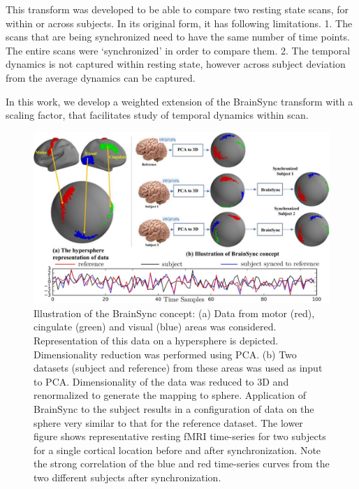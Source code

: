 \documentclass[preprint,12pt]{elsarticle}
\begin{document}
This transform was developed to be able to compare two resting state
scans, for within or across subjects. In its original form, it has
following limitations. 1. The scans that are being synchronized need
to have the same number of time points. The entire scans were `synchronized'
in order to compare them. 2. The temporal dynamics is not captured
within resting state, however across subject deviation from the average
dynamics can be captured.

In this work, we develop a weighted extension of the BrainSync transform
with a scaling factor, that facilitates study of temporal dynamics
within scan.

\begin{figure}
\begin{centering}
\includegraphics[width=1\textwidth]{figs/brainsync_concept} 
\par\end{centering}
\caption{Illustration of the BrainSync concept: (a) Data from motor (red),
cingulate (green) and visual (blue) areas was considered. Representation
of this data on a hypersphere is depicted. Dimensionality reduction
was performed using PCA. (b) Two datasets (subject and reference)
from these areas was used as input to PCA. Dimensionality of the data
was reduced to 3D and renormalized to generate the mapping to sphere.
Application of BrainSync to the subject results in a configuration
of data on the sphere very similar to that for the reference dataset.
The lower figure shows representative resting fMRI time-series for
two subjects for a single cortical location before and after synchronization.
Note the strong correlation of the blue and red time-series curves
from the two different subjects after synchronization. \label{fig:brainsync-transform-illustartion}}
\end{figure}
\end{document}

